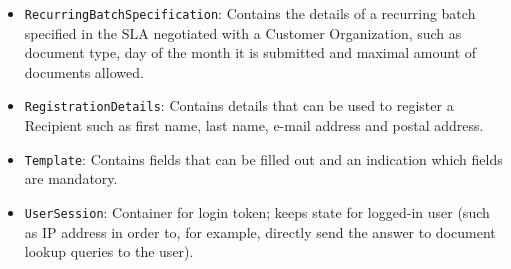 \begin{itemize}
	\item \texttt{RecurringBatchSpecification}: Contains the details of a recurring batch specified in the SLA negotiated with a Customer Organization, such as document type, day of the month it is submitted and maximal amount of documents allowed.
    \item \texttt{RegistrationDetails}: Contains details that can be used to register a Recipient such as first name, last name, e-mail address and postal address.
    \item \texttt{Template}: Contains fields that can be filled out and an indication which fields are mandatory.
    \item \texttt{UserSession}: Container for login token; keeps state for logged-in user (such as IP address in order to, for example, directly send the answer to document lookup queries to the user).
\end{itemize}